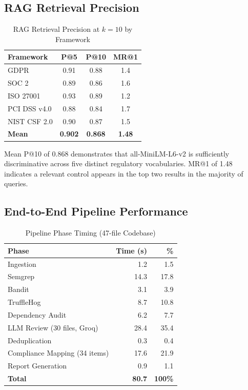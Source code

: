 \documentclass[conference]{IEEEtran}
\begin{document}
\subsection{RAG Retrieval Precision}

\begin{table}[htbp]
\centering
\caption{RAG Retrieval Precision at $k{=}10$ by Framework}
\label{tab:rag}
\scriptsize
\begin{tabular}{@{}lccc@{}}
\toprule
\textbf{Framework} & \textbf{P@5} & \textbf{P@10} & \textbf{MR@1} \\
\midrule
GDPR         & 0.91 & 0.88 & 1.4 \\
SOC 2        & 0.89 & 0.86 & 1.6 \\
ISO 27001    & 0.93 & 0.89 & 1.2 \\
PCI DSS v4.0 & 0.88 & 0.84 & 1.7 \\
NIST CSF 2.0 & 0.90 & 0.87 & 1.5 \\
\midrule
\textbf{Mean} & \textbf{0.902} & \textbf{0.868} & \textbf{1.48} \\
\bottomrule
\end{tabular}
\end{table}

Mean P@10 of 0.868 demonstrates that all-MiniLM-L6-v2 is sufficiently
discriminative across five distinct regulatory vocabularies. MR@1 of 1.48
indicates a relevant control appears in the top two results in the
majority of queries.

\subsection{End-to-End Pipeline Performance}

\begin{table}[htbp]
\centering
\caption{Pipeline Phase Timing (47-file Codebase)}
\label{tab:perf}
\scriptsize
\begin{tabular}{@{}lrr@{}}
\toprule
\textbf{Phase} & \textbf{Time (s)} & \textbf{\%} \\
\midrule
Ingestion                     &  1.2 &  1.5 \\
Semgrep                       & 14.3 & 17.8 \\
Bandit                        &  3.1 &  3.9 \\
TruffleHog                    &  8.7 & 10.8 \\
Dependency Audit              &  6.2 &  7.7 \\
LLM Review (30 files, Groq)   & 28.4 & 35.4 \\
Deduplication                 &  0.3 &  0.4 \\
Compliance Mapping (34 items) & 17.6 & 21.9 \\
Report Generation             &  0.9 &  1.1 \\
\midrule
\textbf{Total}                & \textbf{80.7} & \textbf{100\%} \\
\bottomrule
\end{tabular}
\end{table}
\end{document}
